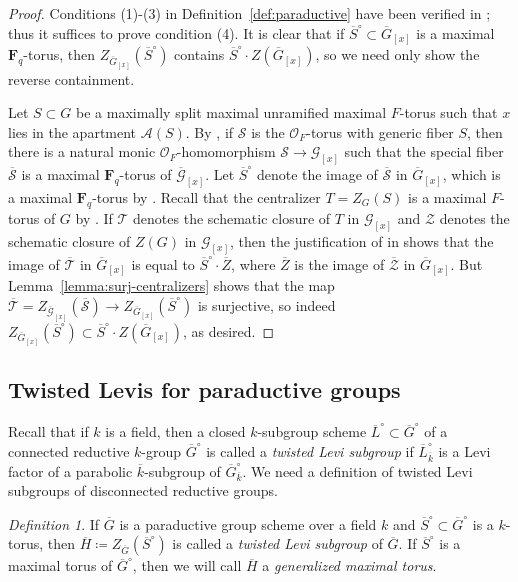 \documentclass[reqno]{amsart}
\numberwithin{equation}{subsection}
\newcommand{\F}{\mathbf{F}}
\newcommand{\ol}[1]{\overline{#1}}
\newcommand\cA{\mathcal{A}}
\newcommand\cG{\mathcal{G}}
\newcommand\cO{\mathcal{O}}
\newcommand\cS{\mathcal{S}}
\newcommand\cT{\mathcal{T}}
\newcommand\cZ{\mathcal{Z}}
\theoremstyle{remark}
\newtheorem{defn}[thm]{Definition}
\numberwithin{equation}{subsection}
\numberwithin{figure}{subsection}
\begin{document}
\begin{proof}
    Conditions (1)-(3) in Definition~\ref{def:paraductive} have been verified in \cite[\S 3.2]{Kal21b}; thus it suffices to prove condition (4). It is clear that if $\ol S^\circ \subset \ol G_{[x]}$ is a maximal $\F_q$-torus, then $Z_{\ol G_{[x]}}(\ol S^\circ)$ contains $\ol S^\circ \cdot Z(\ol G_{[x]})$, so we need only show the reverse containment.

    Let $S \subset G$ be a maximally split maximal unramified maximal $F$-torus such that $x$ lies in the apartment $\cA(S)$. By \cite[Axiom 4.1.20]{KP}, if $\cS$ is the $\cO_F$-torus with generic fiber $S$, then there is a natural monic $\cO_F$-homomorphism $\cS \to \cG_{[x]}$ such that the special fiber $\ol\cS$ is a maximal $\F_q$-torus of $\ol\cG_{[x]}$. Let $\ol S^\circ$ denote the image of $\ol\cS$ in $\ol G_{[x]}$, which is a maximal $\F_q$-torus by \cite[Proposition~11.14(1)]{Bor91}. Recall that the centralizer $T = Z_G(S)$ is a maximal $F$-torus of $G$ by \cite[Remark 16.4]{KP}. If $\cT$ denotes the schematic closure of $T$ in $\cG_{[x]}$ and $\cZ$ denotes the schematic closure of $Z(G)$ in $\cG_{[x]}$, then the justification of \cite[Notation 2.1.2]{Kal21b} in \cite[\S 3.2]{Kal21b} shows that the image of $\ol\cT$ in $\ol G_{[x]}$ is equal to $\ol S^\circ \cdot \ol Z$, where $\ol Z$ is the image of $\ol\cZ$ in $\ol G_{[x]}$. But Lemma~\ref{lemma:surj-centralizers} shows that the map $\ol\cT = Z_{\ol\cG_{[x]}}(\ol\cS) \to Z_{\ol G_{[x]}}(\ol S^\circ)$ is surjective, so indeed $Z_{\ol G_{[x]}}(\ol S^\circ) \subset \ol S^\circ \cdot Z(\ol G_{[x]})$, as desired.
\end{proof}









\subsection{Twisted Levis for paraductive groups}

Recall that if $k$ is a field, then a closed $k$-subgroup scheme $\ol L^\circ \subset \ol G^\circ$ of a connected reductive $k$-group $\ol G^\circ$ is called a \textit{twisted Levi subgroup} if $\ol L^\circ_{\ol k}$ is a Levi factor of a parabolic $\ol k$-subgroup of $\ol G^\circ_{\ol k}$. We need a definition of twisted Levi subgroups of disconnected reductive groups. 

\begin{defn}\label{def:twisted-levi}
    If $\ol G$ is a paraductive group scheme over a field $k$ and $\ol S^\circ \subset \ol G^\circ$ is a $k$-torus, then $\ol H\coloneqq Z_{\ol G}(\ol S^\circ)$ is called a \textit{twisted Levi subgroup} of $\ol G$. If $\ol S^\circ$ is a maximal torus of $\ol G^\circ$, then we will call $\ol H$ a \textit{generalized maximal torus}.
\end{defn}
\end{document}
